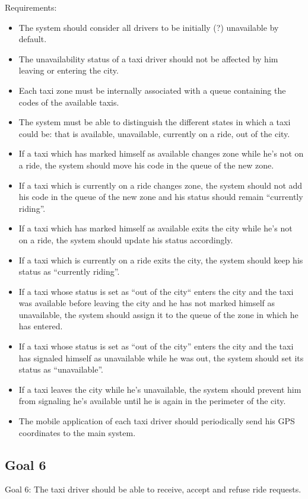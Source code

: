 \documentclass{book}
\begin{document}
Requirements:
\begin{itemize}
\item The system should consider all drivers to be initially (?) unavailable by default.
\item The unavailability status of a taxi driver should not be affected by him leaving or entering the city.
\item Each taxi zone must be internally associated with a queue containing the codes of the available taxis.
\item The system must be able to distinguish the different states in which a taxi could be: that is available, unavailable, currently on a ride, out of the city.
\item If a taxi which has marked himself as available changes zone while he’s not on a ride, the system should move his code in the queue of the new zone. 
\item If a taxi which is currently on a ride changes zone, the system should not add his code in the queue of the new zone and his status should remain “currently riding”.
\item If a taxi which has marked himself as available exits the city while he’s not on a ride, the system should update his status accordingly.
\item If a taxi which is currently on a ride exits the city, the system should keep his status as “currently riding”. 
\item If a taxi whose status is set as “out of the city“  enters the city and the taxi was available before leaving the city and he has not marked himself as unavailable, the system should assign it to the queue of the zone in which he has entered.
\item If a taxi whose status is set as “out of the city” enters the city and the taxi has signaled himself as unavailable while he was out, the system should set its status as “unavailable”. 
\item If a taxi leaves the city while he’s unavailable, the system should prevent him from signaling he’s available until he is again in the perimeter of the city.
\item The mobile application of each taxi driver should periodically send his GPS coordinates to the main system. 
\end{itemize}

\subsection{Goal 6}
Goal 6: The taxi driver should be able to receive, accept and refuse ride requests.
\end{document}

